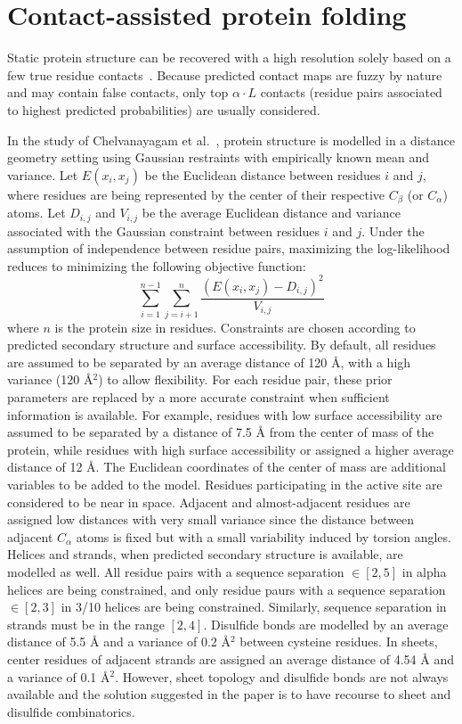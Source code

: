 \section{Contact-assisted protein folding} \label{contactfold}

Static protein structure can be recovered with a high resolution solely based on a few
true residue contacts~\cite{kim2014one}. Because predicted contact maps
are fuzzy by nature and may contain false contacts, only top $\alpha \cdot L$
contacts (residue pairs associated to highest predicted probabilities)
are usually considered.

In the study of Chelvanayagam et al.~\cite{chelvanayagam1998combinatorial}, protein structure is modelled
in a distance geometry setting using Gaussian restraints with empirically known mean and variance.
Let $E(x_i, x_j)$ be the Euclidean distance between residues $i$ and $j$, where residues are being represented
by the center of their respective $C_{\beta}$ (or $C_{\alpha}$) atoms.
Let $D_{i, j}$ and $V_{i, j}$ be the average Euclidean distance and variance associated with the
Gaussian constraint between residues $i$ and $j$. Under the assumption of independence between
residue pairs, maximizing the log-likelihood reduces to minimizing the following objective function:
\begin{equation}
    \sum\limits_{i=1}^{n-1} \sum\limits_{j=i+1}^n \frac{(E(x_i, x_j) - D_{i, j})^2}{V_{i, j}}
\end{equation}
where $n$ is the protein size in residues. Constraints are chosen according to predicted secondary
structure and surface accessibility. By default, all residues are assumed to be separated by an average distance
of 120 \AA{}, with a high variance (120 \AA{}$^2$) to allow flexibility.
For each residue pair, these prior parameters are replaced by a more accurate constraint when sufficient
information is available. For example, residues with low surface accessibility are assumed to be separated
by a distance of 7.5 \AA{} from the center of mass of the protein, while residues with high surface accessibility
or assigned a higher average distance of 12 \AA{}. The Euclidean coordinates of the center of mass are additional
variables to be added to the model. Residues participating in the active site are considered to be near in space.
Adjacent and almost-adjacent residues are assigned low distances with very small variance since the distance
between adjacent $C_{\alpha}$ atoms is fixed but with a small variability induced by torsion angles.
Helices and strands, when predicted secondary structure is available, are modelled as well.
All residue pairs with a sequence separation $\in [2, 5]$ in alpha helices are being constrained,
and only residue paurs with a sequence separation $\in [2, 3]$ in 3/10 helices are being constrained.
Similarly, sequence separation in strands must be in the range $[2, 4]$.
Disulfide bonds are modelled by an average distance of 5.5 \AA{} and a variance of 0.2 \AA{}$^2$ between cysteine
residues. In sheets, center residues of adjacent strands are assigned an average distance of 4.54 \AA{} and a
variance of 0.1 \AA{}$^2$.
However, sheet topology and disulfide bonds are not always available and the solution suggested in the paper
is to have recourse to sheet and disulfide combinatorics.

